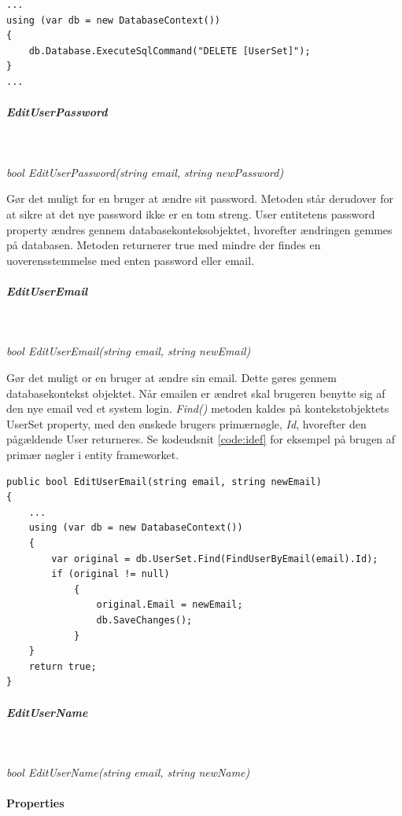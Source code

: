 \begin{lstlisting}[caption=SQL injection på databasen ved sletning af brugere, label=sqlDeleteUsers]
...
using (var db = new DatabaseContext())
{
	db.Database.ExecuteSqlCommand("DELETE [UserSet]");
}
...	
\end{lstlisting}

\subparagraph{EditUserPassword}\

\textit{bool EditUserPassword(string email, string newPassword)}

Gør det muligt for en bruger at ændre sit password. Metoden står derudover for at sikre at det nye password ikke er en tom streng. User entitetens password property ændres gennem databasekonteksobjektet, hvorefter ændringen gemmes på databasen.
Metoden returnerer true med mindre der findes en uoverensstemmelse med enten password eller email.

\subparagraph{EditUserEmail}\

\textit{bool EditUserEmail(string email, string newEmail)}

Gør det muligt or en bruger at ændre sin email. Dette gøres gennem databasekontekst objektet. Når emailen er ændret skal brugeren benytte sig af den nye email ved et system login. \textit{Find()} metoden kaldes på kontekstobjektets UserSet property, med den ønskede brugers primærnøgle, \textit{Id}, hvorefter den pågældende User returneres. Se kodeudsnit \ref{code:idef} for eksempel på brugen af primær nøgler i entity frameworket.

\begin{lstlisting}[caption=EditUserEmail - brug af primær nøgler i Entity Framework,label=code:idef]
public bool EditUserEmail(string email, string newEmail)
{
	...
	using (var db = new DatabaseContext())
	{
		var original = db.UserSet.Find(FindUserByEmail(email).Id);
		if (original != null)
			{
				original.Email = newEmail;
				db.SaveChanges();
			}
	}
	return true;
}

\end{lstlisting}

\subparagraph{EditUserName}\

\textit{bool EditUserName(string email, string newName)}

\paragraph{Properties}\